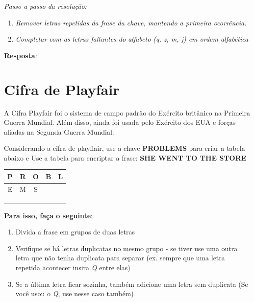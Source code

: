 \textit{Passo a passo da resolução:}
\begin{enumerate}

    \item \textit{Remover letras repetidas da frase da chave, mantendo a primeira ocorrência.}

    \item \textit{Completar com as letras faltantes do alfabeto (q, z, m, j) em ordem alfabética}


\end{enumerate}

\textbf{Resposta}:



\section{Cifra de Playfair}

A Cifra Playfair foi o sistema de campo padrão do Exército britânico na Primeira Guerra Mundial. Além disso, ainda foi usada pelo Exército dos EUA e forças aliadas na Segunda Guerra Mundial.

Considerando a cifra de playflair, use a chave \textbf{PROBLEMS} para criar a tabela abaixo e Use a tabela para encriptar a frase: \textbf{SHE WENT TO THE STORE}




\begin{tabular}{|c|c|c|c|c|}
    \hline
    P & R & O & B & L \\
    \hline
    E & M & S &   &   \\
    \hline
      &   &   &   &   \\
    \hline
      &   &   &   &   \\
    \hline
      &   &   &   &   \\
    \hline
\end{tabular}




\hspace{1cm}

\textbf{Para isso, faça o seguinte}:
\begin{enumerate}
    \item Divida a frase em grupos de duas letras
    \item Verifique se há letras duplicatas no mesmo grupo - se tiver use uma outra letra que não tenha duplicata para separar (ex. sempre que uma letra repetida acontecer insira \textit{Q} entre elas)
    \item Se a última letra ficar sozinha, também adicione uma letra sem duplicata (Se você usou o \textit{Q}, use nesse caso também)
\end{enumerate}


